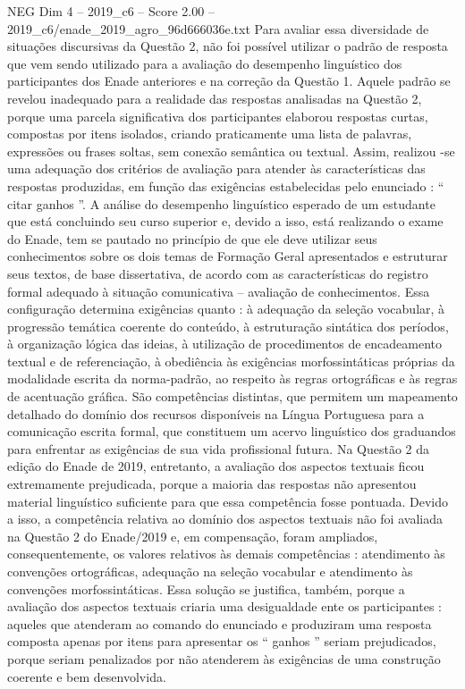 \begin{textsample}{NEG Dim 4 – 2019\_c6 – Score 2.00 – 2019\_c6/enade\_2019\_agro\_96d666036e.txt}
Para avaliar essa diversidade de situações discursivas da Questão 2, não foi possível utilizar o padrão de resposta que vem sendo utilizado para a avaliação do desempenho linguístico dos participantes dos Enade anteriores e na correção da Questão 1.
Aquele padrão se revelou inadequado para a realidade das respostas analisadas na Questão 2, porque uma parcela significativa dos participantes elaborou respostas curtas, compostas por itens isolados, criando praticamente uma lista de palavras, expressões ou frases soltas, sem conexão semântica ou textual.
Assim, realizou -se uma adequação dos critérios de avaliação para atender às características das respostas produzidas, em função das exigências estabelecidas pelo enunciado : “ citar ganhos ”.
A análise do desempenho linguístico esperado de um estudante que está concluindo seu curso superior e, devido a isso, está realizando o exame do Enade, tem se pautado no princípio de que ele deve utilizar seus conhecimentos sobre os dois temas de Formação Geral apresentados e estruturar seus textos, de base dissertativa, de acordo com as características do registro formal adequado à situação comunicativa – avaliação de conhecimentos.
Essa configuração determina exigências quanto : à adequação da seleção vocabular, à progressão temática coerente do conteúdo, à estruturação sintática dos períodos, à organização lógica das ideias, à utilização de procedimentos de encadeamento textual e de referenciação, à obediência às exigências morfossintáticas próprias da modalidade escrita da norma-padrão, ao respeito às regras ortográficas e às regras de acentuação gráfica.
São competências distintas, que permitem um mapeamento detalhado do domínio dos recursos disponíveis na Língua Portuguesa para a comunicação escrita formal, que constituem um acervo linguístico dos graduandos para enfrentar as exigências de sua vida profissional futura.
Na Questão 2 da edição do Enade de 2019, entretanto, a avaliação dos aspectos textuais ficou extremamente prejudicada, porque a maioria das respostas não apresentou material linguístico suficiente para que essa competência fosse pontuada.
Devido a isso, a competência relativa ao domínio dos aspectos textuais não foi avaliada na Questão 2 do Enade/2019 e, em compensação, foram ampliados, consequentemente, os valores relativos às demais competências : atendimento às convenções ortográficas, adequação na seleção vocabular e atendimento às convenções morfossintáticas.
Essa solução se justifica, também, porque a avaliação dos aspectos textuais criaria uma desigualdade ente os participantes : aqueles que atenderam ao comando do enunciado e produziram uma resposta composta apenas por itens para apresentar os “ ganhos ” seriam prejudicados, porque seriam penalizados por não atenderem às exigências de uma construção coerente e bem desenvolvida.

\end{textsample}
